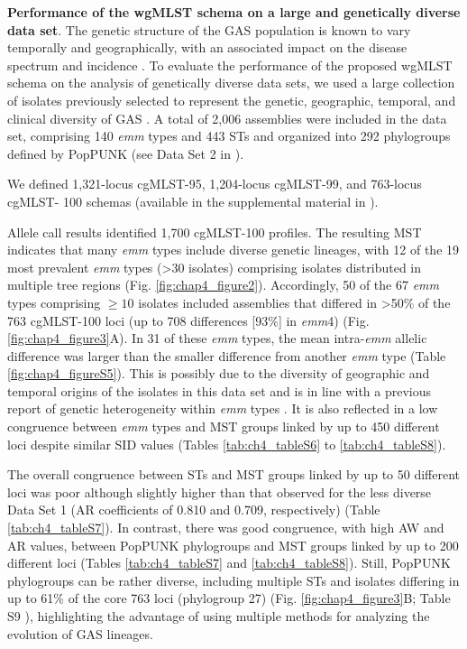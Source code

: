 \textbf{Performance of the wgMLST schema on a large and genetically diverse data set}. The genetic structure of the \ac{GAS} population is known to vary temporally and geographically, with an associated impact on the disease spectrum and incidence \cite{steer_global_2009, barnett_fall_2018}. To evaluate the performance of the proposed \ac{wgMLST} schema on the analysis of genetically diverse data sets, we used a large collection of isolates previously selected to represent the genetic, geographic, temporal, and clinical diversity of \ac{GAS} \cite{davies_atlas_2019}. A total of 2,006 assemblies were included in the data set, comprising 140 \textit{emm} types and 443 \ac{ST}s and organized into 292 phylogroups defined by \ac{PopPUNK} \cite{davies_atlas_2019, lees_fast_2019} (see Data Set 2 in \cite{friaes_supplemental_2023}).

We defined 1,321-locus cgMLST-95, 1,204-locus cgMLST-99, and 763-locus cgMLST- 100 schemas (available in the supplemental material in \cite{friaes_supplemental_2023}).

Allele call results identified 1,700 cgMLST-100 profiles. The resulting \ac{MST} indicates that many \textit{emm} types include diverse genetic lineages, with 12 of the 19 most prevalent \textit{emm} types (>30 isolates) comprising isolates distributed in multiple tree regions (Fig. \ref{fig:chap4_figure2}). Accordingly, 50 of the 67 \textit{emm} types comprising $\geq10$ isolates included assemblies that differed in >50\% of the 763 cgMLST-100 loci (up to 708 differences [93\%] in \textit{emm}4) (Fig. \ref{fig:chap4_figure3}A). In 31 of these \textit{emm} types, the mean intra-\textit{emm} allelic difference was larger than the smaller difference from another \textit{emm} type (Table \ref{fig:chap4_figureS5}). This is possibly due to the diversity of geographic and temporal origins of the isolates in this data set and is in line with a previous report of genetic heterogeneity within \textit{emm} types \cite{davies_atlas_2019}. It is also reflected in a low congruence between \textit{emm} types and \ac{MST} groups linked by up to 450 different loci despite similar \ac{SID} values (Tables \ref{tab:ch4_tableS6} to \ref{tab:ch4_tableS8}).

The overall congruence between \ac{ST}s and \ac{MST} groups linked by up to 50 different loci was poor although slightly higher than that observed for the less diverse Data Set 1 (\ac{AR} coefficients of 0.810 and 0.709, respectively) (Table \ref{tab:ch4_tableS7}). In contrast, there was good congruence, with high \ac{AW} and \ac{AR} values, between \ac{PopPUNK} phylogroups and \ac{MST} groups linked by up to 200 different loci (Tables \ref{tab:ch4_tableS7} and \ref{tab:ch4_tableS8}). Still, \ac{PopPUNK} phylogroups can be rather diverse, including multiple \ac{ST}s and isolates differing in up to 61\% of the core 763 loci (phylogroup 27) (Fig. \ref{fig:chap4_figure3}B; Table S9 \cite{friaes_supplemental_2023}), highlighting the advantage of using multiple methods for analyzing the evolution of \ac{GAS} lineages.

